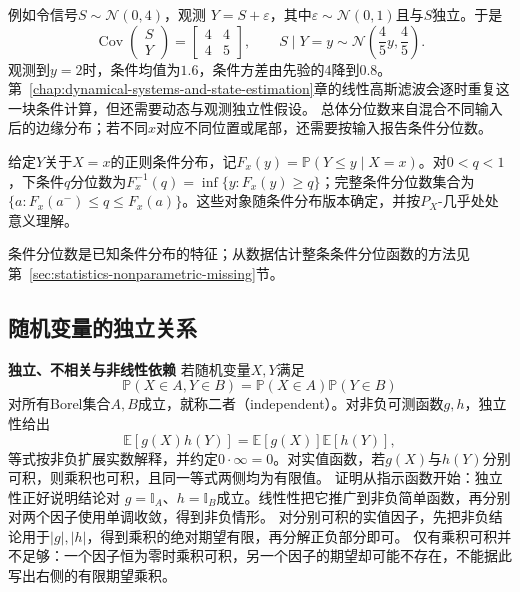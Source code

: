例如令信号\(S\sim\mathcal{N}(0,4)\)，观测
\(Y=S+\varepsilon\)，其中\(\varepsilon\sim\mathcal{N}(0,1)\)且与\(S\)独立。于是
\[
  \operatorname{Cov}
  \begin{pmatrix}S\\Y\end{pmatrix}
  =
  \begin{bmatrix}4&4\\4&5\end{bmatrix},
  \qquad
  S\mid Y=y\sim\mathcal{N}\left(\frac45y,\frac45\right).
\]
观测到\(y=2\)时，条件均值为\(1.6\)，条件方差由先验的\(4\)降到\(0.8\)。第~\ref{chap:dynamical-systems-and-state-estimation}章的线性高斯滤波会逐时重复这一块条件计算，但还需要动态与观测独立性假设。
总体分位数来自混合不同输入后的边缘分布；若不同\(x\)对应不同位置或尾部，还需要按输入报告条件分位数。
\begin{definition}[条件分位数]
  \label{def:statistics-conditional-quantile}
给定\(Y\)关于\(X=x\)的正则条件分布，记\(F_x(y)=\mathbb P(Y\leq y\mid X=x)\)。对\(0<q<1\)，下条件\(q\)分位数为\(F_x^{-1}(q)=\inf\{y:F_x(y)\geq q\}\)；完整条件分位数集合为\(\{a:F_x(a^-)\leq q\leq F_x(a)\}\)。这些对象随条件分布版本确定，并按\(P_X\)-几乎处处意义理解。
\end{definition}
条件分位数是已知条件分布的特征；从数据估计整条条件分位函数的方法见第~\ref{sec:statistics-nonparametric-missing}节。

\subsection{随机变量的独立关系}
\label{sec:probability-moments-independence}

\par\medskip\noindent\textbf{独立、不相关与非线性依赖}\quad
若随机变量\(X,Y\)满足
\[ \mathbb{P}(X\in A,Y\in B)
  =\mathbb{P}(X\in A)\mathbb{P}(Y\in B) \]
对所有Borel集合\(A,B\)成立，就称二者（independent）。对非负可测函数\(g,h\)，独立性给出
\[
 \mathbb{E}[g(X)h(Y)]=\mathbb{E}[g(X)]\mathbb{E}[h(Y)],
\]
等式按非负扩展实数解释，并约定\(0\cdot\infty=0\)。对实值函数，若\(g(X)\)与\(h(Y)\)分别可积，则乘积也可积，且同一等式两侧均为有限值。
证明从指示函数开始：独立性正好说明结论对
\(g=\mathbb{I}_A\)、\(h=\mathbb{I}_B\)成立。线性性把它推广到非负简单函数，再分别对两个因子使用单调收敛，得到非负情形。
对分别可积的实值因子，先把非负结论用于\(|g|,|h|\)，得到乘积的绝对期望有限，再分解正负部分即可。
仅有乘积可积并不足够：一个因子恒为零时乘积可积，另一个因子的期望却可能不存在，不能据此写出右侧的有限期望乘积。

